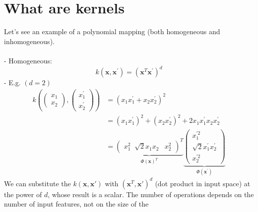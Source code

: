 \section{What are kernels}
Let's see an example of a polynomial mapping (both homogeneous and inhomogeneous).
\\ \\ - Homogeneous:
\[
	k\left(\mathbf{x}, \mathbf{x}^{\prime}\right)=\left(\mathbf{x}^{T}\mathbf{x}^{\prime}
	\right)^{d}
\]
- E.g. $(d=2)$
\[
	\begin{aligned}
		k\left(\left(\begin{array}{l}x_1 \\ x_2\end{array}\right),\left(\begin{array}{l}x_1^{\prime} \\ x_2^{\prime}\end{array}\right)\right) & =\left(x_{1}x_{1}^{\prime}+x_{2}x_{2}^{\prime}\right)^{2}                                                                                                                                                                                                                           \\
		                                                                                                                                      & =\left(x_{1}x_{1}^{\prime}\right)^{2}+\left(x_{2}x_{2}^{\prime}\right)^{2}+2 x_{1}x_{1}^{\prime}x_{2}x_{2}^{\prime}                                                                                                                                                                 \\
		                                                                                                                                      & =\underbrace{\left(\begin{array}{lll}x_1^2 \;\; \sqrt{2}x_1 x_2 & x_2^2\end{array}\right)^T}_{\Phi(\mathbf{x})^T}\underbrace{\left(\begin{array}{c}x_1^{\prime 2} \\ \sqrt{2} x_1^{\prime} x_2^{\prime} \\ x_2^{\prime 2}\end{array}\right)}_{\Phi\left(\mathbf{x}^{\prime}\right)}
	\end{aligned}
\]
We can substitute the $k(\pmb{x}, \pmb{x}')$ with $(\pmb{x}^{T}, \pmb{x}')^{d}$ (dot
product in input space) at the power of $d$, whose result is a scalar. The number
of operations depends on the number of input features, not on the size of the
